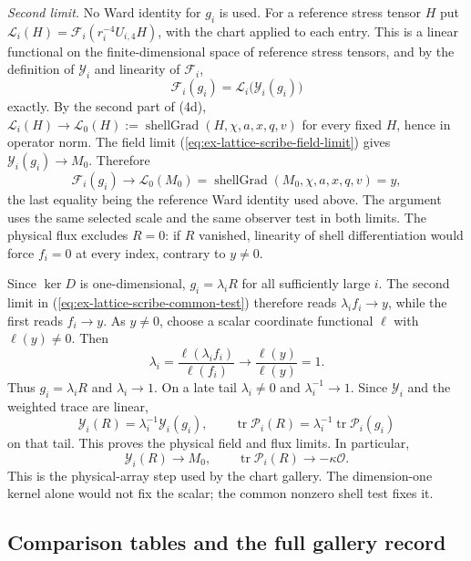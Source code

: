 \emph{Second limit.} No Ward identity for $g_i$ is used. For a reference
stress tensor $H$ put $\mathcal L_i(H)=\mathscr F_i(r_i^{-4}U_{i,4}H)$,
with the chart applied to each entry. This is a linear functional on the
finite-dimensional space of reference stress tensors, and by the
definition of $\mathcal Y_i$ and linearity of $\mathscr F_i$,
\[
 \mathscr F_i(g_i)=\mathcal L_i\bigl(\mathcal Y_i(g_i)\bigr)
\]
exactly. By the second part of (4d), $\mathcal L_i(H)\to\mathcal L_0(H)
:=\operatorname{shellGrad}(H,\chi,a,x,q,v)$ for every fixed $H$, hence
in operator norm. The field limit
(\ref{eq:ex-lattice-scribe-field-limit}) gives
$\mathcal Y_i(g_i)\to M_0$. Therefore
\[
 \mathscr F_i(g_i)\longrightarrow\mathcal L_0(M_0)
 =\operatorname{shellGrad}(M_0,\chi,a,x,q,v)=y,
\]
the last equality being the reference Ward identity used above.
The argument uses the same selected scale and the same observer test in both
limits. The physical flux excludes $R=0$: if $R$ vanished, linearity of
shell differentiation would force $f_i=0$ at every index, contrary to
$y\ne0$.

Since $\ker D$ is one-dimensional, $g_i=\lambda_iR$ for all sufficiently
large $i$. The second limit in (\ref{eq:ex-lattice-scribe-common-test})
therefore reads $\lambda_i f_i\to y$, while the first reads $f_i\to y$.
As $y\ne0$, choose a scalar coordinate functional $\ell$ with $\ell(y)\ne0$.
Then
\[
 \lambda_i=\frac{\ell(\lambda_i f_i)}{\ell(f_i)}\longrightarrow
 \frac{\ell(y)}{\ell(y)}=1.
\]
Thus $g_i=\lambda_iR$ and $\lambda_i\to1$. On a late tail
$\lambda_i\ne0$ and $\lambda_i^{-1}\to1$. Since $\mathcal Y_i$
and the weighted trace are linear,
\[
 \mathcal Y_i(R)=\lambda_i^{-1}\mathcal Y_i(g_i),
 \qquad
 \operatorname{tr}\mathcal P_i(R)=\lambda_i^{-1}
       \operatorname{tr}\mathcal P_i(g_i)
\]
on that tail. This proves the physical field and flux limits. In particular,
\begin{equation}
 \mathcal Y_i(R)\longrightarrow M_0,
 \qquad \operatorname{tr}\mathcal P_i(R)\longrightarrow-\kappa\mathcal O.
 \label{eq:ex-lattice-scribe-physical-transfer}
\end{equation}
This is the physical-array step used by the chart gallery. The dimension-one
kernel alone would not fix the scalar; the common nonzero shell test fixes it.

\subsection{Comparison tables and the full gallery record}

